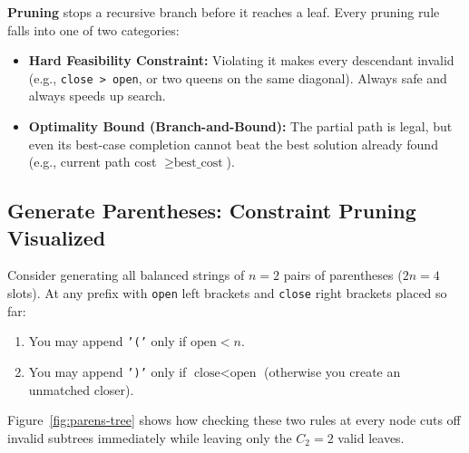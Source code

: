 \documentclass[11pt,a4paper]{article}
\theoremstyle{definition}
\begin{document}
\textbf{Pruning} stops a recursive branch before it reaches a leaf. Every pruning rule falls into one of two categories:
\begin{itemize}
    \item \textbf{Hard Feasibility Constraint:} Violating it makes every descendant invalid (e.g., \texttt{close > open}, or two queens on the same diagonal). Always safe and always speeds up search.
    \item \textbf{Optimality Bound (Branch-and-Bound):} The partial path is legal, but even its best-case completion cannot beat the best solution already found (e.g., current path cost $\ge \text{best\_cost}$).
\end{itemize}

\subsection{Generate Parentheses: Constraint Pruning Visualized}

Consider generating all balanced strings of $n = 2$ pairs of parentheses ($2n = 4$ slots). At any prefix with \texttt{open} left brackets and \texttt{close} right brackets placed so far:
\begin{enumerate}
    \item You may append \texttt{'('} only if $\text{open} < n$.
    \item You may append \texttt{')'} only if $\text{close} < \text{open}$ (otherwise you create an unmatched closer).
\end{enumerate}

Figure~\ref{fig:parens-tree} shows how checking these two rules at every node cuts off invalid subtrees immediately while leaving only the $C_2 = 2$ valid leaves.
\end{document}
